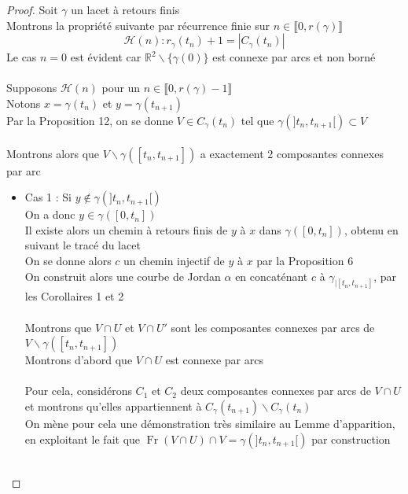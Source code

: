 \documentclass{article}
\begin{document}
\begin{flushleft}
\begin{proof}
    Soit $\gamma$ un lacet à retours finis\\
    Montrons la propriété suivante par récurrence finie sur $n \in \llbracket 0, r(\gamma) \rrbracket$
    \[ \mathcal{H}(n) : r_{\gamma}(t_n) + 1 = |C_{\gamma}(t_n)| \]
    Le cas $n = 0$ est évident car $\mathbb{R}^2 \backslash \{ \gamma(0) \}$ est connexe par arcs et non borné
    \\~\\
    Supposons $\mathcal{H}(n)$ pour un $n \in \llbracket 0, r(\gamma)-1 \rrbracket$\\
    Notons $x = \gamma(t_n)$ et $y = \gamma(t_{n+1})$\\
    Par la Proposition 12, on se donne $V \in C_{\gamma}(t_n)$ tel que $\gamma(]t_n, t_{n+1}[) \subset V$
    \\~\\
    Montrons alors que $V \backslash \gamma([t_n, t_{n+1}])$ a exactement 2 composantes connexes par arc
    \begin{itemize}
        \item Cas 1 : Si $y \notin \gamma(]t_n, t_{n+1}[)$\\
        On a donc $y \in \gamma([0, t_n])$\\
        Il existe alors un chemin à retours finis de $y$ à $x$ dans $\gamma([0, t_n])$, obtenu en suivant le tracé du lacet\\
        On se donne alors $c$ un chemin injectif de $y$ à $x$ par la Proposition 6\\
        On construit alors une courbe de Jordan $\alpha$ en concaténant $c$ à $\gamma_{\mid [t_n, t_{n+1}]}$, par les Corollaires 1 et 2
        \\~\\
        Montrons que $V \cap U$ et $V \cap U'$ sont les composantes connexes par arcs de $V \backslash \gamma([t_n, t_{n+1}])$\\
        Montrons d'abord que $V \cap U$ est connexe par arcs
        \\~\\
        Pour cela, considérons $C_1$ et $C_2$ deux composantes connexes par arcs de $V \cap U$ et montrons qu'elles
        appartiennent à $C_{\gamma}(t_{n+1}) \backslash C_{\gamma}(t_n)$\\
        On mène pour cela une démonstration très similaire au Lemme d'apparition, en exploitant le fait que
        $\operatorname{Fr}(V \cap U) \cap V = \gamma(]t_n, t_{n+1}[)$ par construction
        \\~\\

\end{itemize}
\end{proof}
\end{flushleft}
\end{document}
